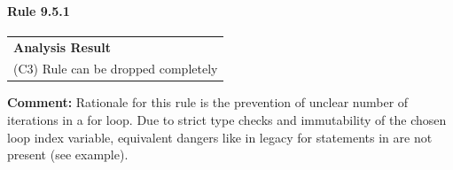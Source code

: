 \paragraph{Rule 9.5.1}
\begin{longtable}{p{13cm}}
\textbf{Analysis Result} \\
(C3) Rule can be dropped completely \\
\end{longtable}
\textbf{Comment:} Rationale for this rule is the prevention of unclear number of iterations in a for loop. Due to strict type checks and immutability of the chosen loop index variable, equivalent dangers like in legacy for statements in \Cpp are not present (see example). \\



